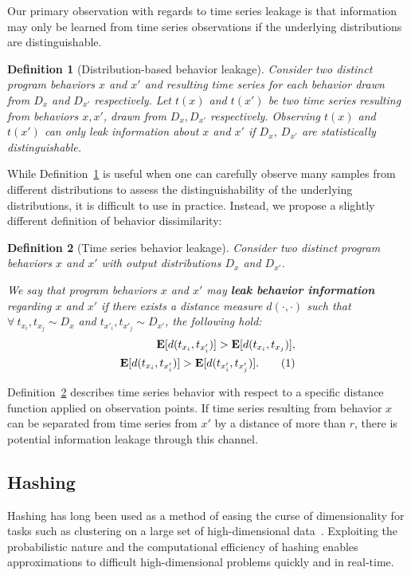 \documentclass[a4paper]{article}
\newcommand\numberthis{\addtocounter{equation}{1}\tag{\theequation}}
\theoremstyle{def}
\newtheorem{definition}{Definition}
\theoremstyle{thm}
\begin{document}
Our primary observation with regards to time series leakage is that information may only be learned from time series observations if the underlying distributions are distinguishable.

\begin{definition}[Distribution-based behavior leakage]\label{defn:dist_leakage}
    Consider two distinct program behaviors $x$ and $x'$ and resulting time series for each behavior drawn from $D_x$ and $D_{x'}$ respectively.
    Let $t(x)$ and $t(x')$ be two time series resulting from behaviors $x, x'$, drawn from $D_x, D_{x'}$ respectively.
    Observing $t(x)$ and $t(x')$ can only leak information about $x$ and $x'$ if $D_x$, $D_{x'}$ are statistically distinguishable.
\end{definition}

While Definition~\ref{defn:dist_leakage} is useful when one can carefully observe many samples from different distributions to assess the distinguishability of the underlying distributions, it is difficult to use in practice.
Instead, we propose a slightly different definition of behavior dissimilarity:

\begin{definition}[Time series behavior leakage]\label{defn:leakage}
    Consider two distinct program behaviors $x$ and $x'$ with output distributions $D_x$ and $D_{x'}$.
    
    We say that program behaviors $x$ and $x'$ may \textbf{leak behavior information} regarding $x$ and $x'$ if there exists a distance measure $d(\cdot, \cdot)$ such that $\forall~t_{x_i}, t_{x_j} \sim D_x$ and $t_{x'_i}, t_{x'_j} \sim D_{x'}$, the following hold:
    \begin{align*}
        \mathbf{E}[d(t_{x_i}, t_{x'_i})] > \mathbf{E}[d(t_{x_i}, t_{x_j})],\\
        \mathbf{E}[d(t_{x_i}, t_{x'_i})] > \mathbf{E}[d(t_{x'_i}, t_{x'_j})]. \numberthis
    \end{align*}

\end{definition}

Definition~\ref{defn:leakage} describes time series behavior with respect to a specific distance function applied on observation points.
If time series resulting from behavior $x$ can be separated from time series from $x'$ by a distance of more than $r$, there is potential information leakage through this channel.

\subsection{Hashing}
\label{subsec:hashing}
Hashing has long been used as a method of easing the curse of dimensionality for tasks such as clustering on a large set of high-dimensional data~\cite{Indyk98-ANN,Gionis99-SSH,Datar04-LSH}.
Exploiting the probabilistic nature and the computational efficiency of hashing enables approximations to difficult high-dimensional problems quickly and in real-time.
\end{document}
